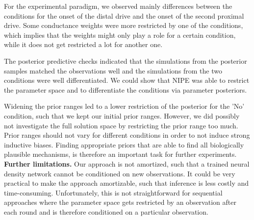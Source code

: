 \documentclass[12pt]{extreport}
\begin{document}

For the experimental paradigm, we observed mainly differences between the conditions for the onset of the distal drive and the onset of the second proximal drive. Some conductance weights were more restricted by one of the conditions, which implies that the weights might only play a role for a certain condition, while it does not get restricted a lot for another one. 

The posterior predictive checks indicated that the simulations from the posterior samples matched the observations well and the simulations from the two conditions were well differentiated. We could show that NIPE was able to restrict the parameter space and to differentiate the conditions via parameter posteriors.

Widening the prior ranges led to a lower restriction of the posterior for the 'No' condition, such that we kept our initial prior ranges. However, we did possibly not investigate the full solution space by restricting the prior range too much. Prior ranges should not vary for different conditions in order to not induce strong inductive biases. Finding appropriate priors that are able to find all biologically plausible mechanisms, is therefore an important task for further experiments. \\





\textbf{Further limitations.} Our approach is not amortized, such that a trained neural density network cannot be conditioned on new observations.
It could be very practical to make the approach amortizable, such that inference is less costly and time-consuming. Unfortunately, this is not straightforward for sequential approaches where the parameter space gets restricted by an observation after each round and is therefore conditioned on a particular observation. \\
\end{document}
